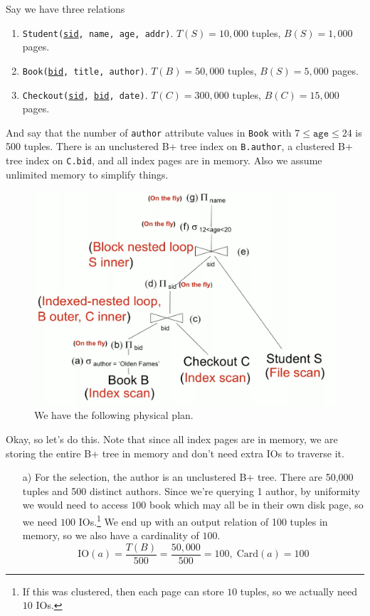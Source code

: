   \begin{example}
    Say we have three relations 
    \begin{enumerate}
      \item \texttt{Student(\underline{sid}, name, age, addr)}. $T(S) = 10,000$ tuples, $B(S) = 1,000$ pages. 
      \item \texttt{Book(\underline{bid}, title, author)}. $T(B) = 50,000$ tuples, $B(S) = 5,000$ pages. 
      \item \texttt{Checkout(\underline{sid}, \underline{bid}, date)}. $T(C) = 300,000$ tuples, $B(C) = 15,000$ pages. 
    \end{enumerate}
    And say that the number of \texttt{author} attribute values in \texttt{Book} with $7 \leq \texttt{age} \leq 24$ is 500 tuples. There is an unclustered B+ tree index on \texttt{B.author}, a clustered B+ tree index on \texttt{C.bid}, and all index pages are in memory. Also we assume unlimited memory to simplify things. 
    \begin{figure}[H]
      \centering 
      \includegraphics[scale=0.4]{img/book_plan.png}
      \caption{We have the following physical plan.} 
      \label{fig:book_plan}
    \end{figure} 
    Okay, so let's do this. Note that since all index pages are in memory, we are storing the entire B+ tree in memory and don't need extra IOs to traverse it.  
    \begin{enumerate}
      \item[a)] For the selection, the author is an unclustered B+ tree. There are 50,000 tuples and 500 distinct authors. Since we're querying 1 author, by uniformity we would need to access $100$ book which may all be in their own disk page, so we need $100$ IOs.\footnote{If this was clustered, then each page can store $10$ tuples, so we actually need $10$ IOs. } We end up with an output relation of 100 tuples in memory, so we also have a cardinality of $100$. 
        \begin{equation}
          \mathrm{IO}(a) = \frac{T(B)}{500} = \frac{50,000}{500} = 100, \; \mathrm{Card}(a) = 100 
        \end{equation}


\end{enumerate}
\end{example}
